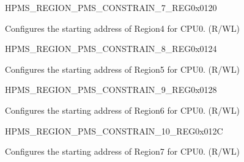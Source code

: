 \begin{register}{H}{PMS\_REGION\_PMS\_CONSTRAIN\_7\_REG}{0x0120}\label{regdesc:PMSREGIONPMSCONSTRAIN7REG}
%
%
\regnewline%
\begin{regdesc}\begin{reglist}
\label{fielddesc:PMSREGIONPMSCONSTRAINADDR4}\item [PMS\_REGION\_PMS\_CONSTRAIN\_ADDR\_4] Configures the starting address of Region4 for CPU0. (R/WL)
\end{reglist}\end{regdesc}
\end{register}


\begin{register}{H}{PMS\_REGION\_PMS\_CONSTRAIN\_8\_REG}{0x0124}\label{regdesc:PMSREGIONPMSCONSTRAIN8REG}
%
%
\regnewline%
\begin{regdesc}\begin{reglist}
\label{fielddesc:PMSREGIONPMSCONSTRAINADDR5}\item [PMS\_REGION\_PMS\_CONSTRAIN\_ADDR\_5] Configures the starting address of Region5 for CPU0. (R/WL)
\end{reglist}\end{regdesc}
\end{register}


\begin{register}{H}{PMS\_REGION\_PMS\_CONSTRAIN\_9\_REG}{0x0128}\label{regdesc:PMSREGIONPMSCONSTRAIN9REG}
%
%
\regnewline%
\begin{regdesc}\begin{reglist}
\label{fielddesc:PMSREGIONPMSCONSTRAINADDR6}\item [PMS\_REGION\_PMS\_CONSTRAIN\_ADDR\_6] Configures the starting address of Region6 for CPU0. (R/WL)
\end{reglist}\end{regdesc}
\end{register}


\begin{register}{H}{PMS\_REGION\_PMS\_CONSTRAIN\_10\_REG}{0x012C}\label{regdesc:PMSREGIONPMSCONSTRAIN10REG}
%
%
\regnewline%
\begin{regdesc}\begin{reglist}
\label{fielddesc:PMSREGIONPMSCONSTRAINADDR7}\item [PMS\_REGION\_PMS\_CONSTRAIN\_ADDR\_7] Configures the starting address of Region7 for CPU0. (R/WL)
\end{reglist}\end{regdesc}
\end{register}


